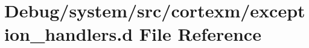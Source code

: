 \hypertarget{exception__handlers_8d}{}\section{Debug/system/src/cortexm/exception\+\_\+handlers.d File Reference}
\label{exception__handlers_8d}

